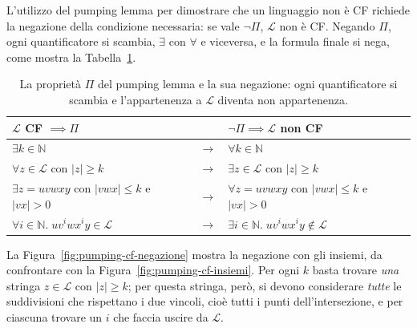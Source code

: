 \documentclass[a4paper, 11pt, oneside]{book}
\theoremstyle{formale}
\begin{document}
    L'utilizzo del pumping lemma per dimostrare che un linguaggio non \`e CF richiede la
    negazione della condizione necessaria: se vale $\neg \Pi$, $\mathcal{L}$ non \`e CF.
    Negando $\Pi$, ogni quantificatore si scambia, $\exists$ con $\forall$ e viceversa, e
    la formula finale si nega, come mostra la Tabella~\ref{tab:negazione-pumping-cf}.

    \begin{table}[H]
        \centering
        \begin{tabular}{lcl}
            \toprule
            $\mathcal{L}$ CF $\implies \Pi$ & &
                $\neg \Pi \implies \mathcal{L}$ non CF \\
            \midrule
            $\exists k \in \mathbb{N}$ & $\to$ & $\forall k \in \mathbb{N}$ \\
            $\forall z \in \mathcal{L}$ con $|z| \geq k$ & $\to$ &
                $\exists z \in \mathcal{L}$ con $|z| \geq k$ \\
            $\exists z = uvwxy$ con $|vwx| \leq k$ e $|vx| > 0$ & $\to$ &
                $\forall z = uvwxy$ con $|vwx| \leq k$ e $|vx| > 0$ \\
            $\forall i \in \mathbb{N}.\; uv^i w x^i y \in \mathcal{L}$ & $\to$ &
                $\exists i \in \mathbb{N}.\; uv^i w x^i y \notin \mathcal{L}$ \\
            \bottomrule
        \end{tabular}
        \caption{La propriet\`a $\Pi$ del pumping lemma e la sua negazione: ogni
            quantificatore si scambia e l'appartenenza a $\mathcal{L}$ diventa
            non appartenenza.}
        \label{tab:negazione-pumping-cf}
    \end{table}

    La Figura~\ref{fig:pumping-cf-negazione} mostra la negazione con gli insiemi, da
    confrontare con la Figura~\ref{fig:pumping-cf-insiemi}. Per ogni $k$ basta trovare
    \emph{una} stringa $z \in \mathcal{L}$ con $|z| \geq k$; per questa stringa,
    per\`o, si devono considerare \emph{tutte} le suddivisioni che rispettano i due
    vincoli, cio\`e tutti i punti dell'intersezione, e per ciascuna trovare un $i$ che
    faccia uscire da $\mathcal{L}$.
\end{document}
